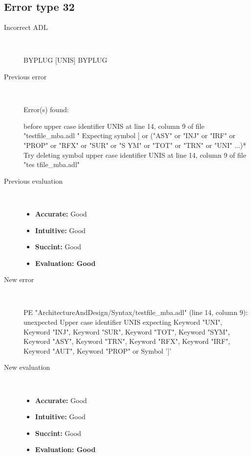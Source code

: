 \subsection{Error type 32}
  \begin{description}
  \item[Incorrect ADL]~\\
\begin{adl}
BYPLUG [UNIS] BYPLUG\end{adl}
  \item[Previous error]~\\
\begin{haskell}
Error(s) found:

before upper case identifier UNIS at line 14, column 9 of file "testfile_mba.adl
"
Expecting symbol ] or ("ASY" or "INJ" or "IRF" or "PROP" or "RFX" or "SUR" or "S
YM" or "TOT" or "TRN" or "UNI" ...)*
Try deleting symbol upper case identifier UNIS at line 14, column 9 of file "tes
tfile_mba.adl"
\end{haskell}
  \item[Previous evaluation]~\\
    \begin{itemize}
    \item \textbf{Accurate:} Good
    \item \textbf{Intuitive:} Good
    \item \textbf{Succint:} Good
    \item \textbf{Evaluation: Good}
    \end{itemize}
  \item[New error]~\\
\begin{haskell}
PE "ArchitectureAndDesign/Syntax/testfile_mba.adl" (line 14, column 9):
unexpected Upper case identifier UNIS
expecting Keyword "UNI", Keyword "INJ", Keyword "SUR", Keyword "TOT", Keyword "SYM", Keyword "ASY", Keyword "TRN", Keyword "RFX", Keyword "IRF", Keyword "AUT", Keyword "PROP" or Symbol ']'
\end{haskell}
  \item[New evaluation]~\\
    \begin{itemize}
    \item \textbf{Accurate:} Good
    \item \textbf{Intuitive:} Good
    \item \textbf{Succint:} Good
    \item \textbf{Evaluation: Good
}
    \end{itemize}
  \end{description}

